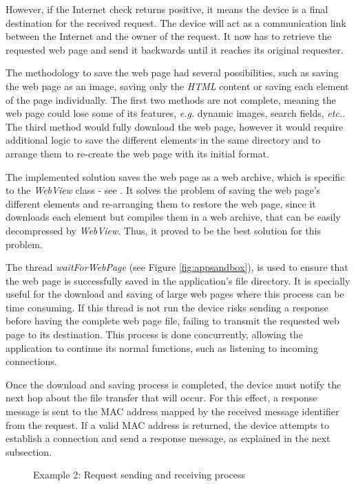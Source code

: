 However, if the Internet check returns positive, it means the device is a final destination for the received request. The device will act as a communication link between the Internet and the owner of the request. It now has to retrieve the requested web page and send it backwards until it reaches its original requester.

The methodology to save the web page had several possibilities, such as saving the web page as an image, saving only the \textit{HTML} content or saving each element of the page individually. The first two methods are not complete, meaning the web page could lose some of its features, \textit{e.g.} dynamic images, search fields, \textit{etc.}. The third method would fully download the web page, however it would require additional logic to save the different elements in the same directory and to arrange them to re-create the web page with its initial format.

The implemented solution saves the web page as a web archive, which is specific to the \textit{WebView} class - see \cite{webview}. It solves the problem of saving the web page's different elements and re-arranging them to restore the web page, since it downloads each element but compiles them in a web archive, that can be easily decompressed by \textit{WebView}. Thus, it proved to be the best solution for this problem.

The thread \textit{waitForWebPage} (see Figure \ref{fig:appsandbox}), is used to ensure that the web page is successfully saved in the application's file directory. It is specially useful for the download and saving of large web pages where this process can be time consuming. If this thread is not run the device risks sending a response before having the complete web page file, failing to transmit the requested web page to its destination. This process is done concurrently, allowing the application to continue its normal functions, such as listening to incoming connections.

Once the download and saving process is completed, the device must notify the next hop about the file transfer that will occur. For this effect, a response message is sent to the \gls{MAC} address mapped by the received message identifier from the request. If a valid \gls{MAC} address is returned, the device attempts to establish a connection and send a response message, as explained in the next subsection.

\begin{figure}[ht]
   \noindent{}
	\caption{\label{fig:example1.1} Example 2: Request sending and receiving process}
\end{figure}

